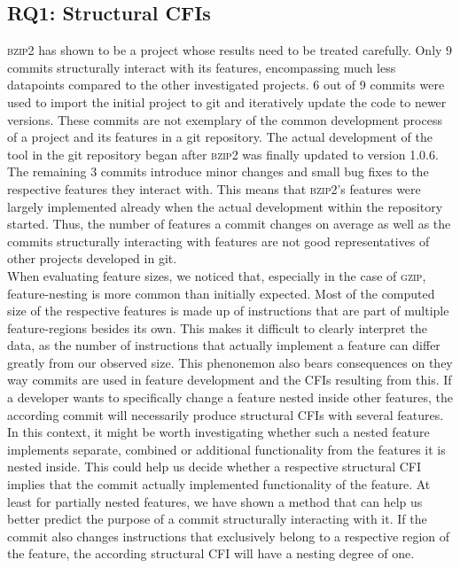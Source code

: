 \subsection*{\textbf{RQ1: Structural CFIs}}\label{sec:eval_struc_cfis}

\textsc{bzip2} has shown to be a project whose results need to be treated carefully.
Only 9 commits structurally interact with its features, encompassing much less datapoints compared to the other investigated projects.
6 out of 9 commits were used to import the initial project to git and iteratively update the code to newer versions.
These commits are not exemplary of the common development process of a project and its features in a git repository.
The actual development of the tool in the git repository began after \textsc{bzip2} was finally updated to version 1.0.6.
The remaining 3 commits introduce minor changes and small bug fixes to the respective features they interact with.
This means that \textsc{bzip2}'s features were largely implemented already when the actual development within the repository started.
Thus, the number of features a commit changes on average as well as the commits structurally interacting with features are not good representatives of other projects developed in git. \\
When evaluating feature sizes, we noticed that, especially in the case of \textsc{gzip}, feature-nesting is more common than initially expected.
Most of the computed size of the respective features is made up of instructions that are part of multiple feature-regions besides its own.
This makes it difficult to clearly interpret the data, as the number of instructions that actually implement a feature can differ greatly from our observed size.
This phenonemon also bears consequences on they way commits are used in feature development and the CFIs resulting from this.
If a developer wants to specifically change a feature nested inside other features, the according commit will necessarily produce structural CFIs with several features.
In this context, it might be worth investigating whether such a nested feature implements separate, combined or additional functionality from the features it is nested inside.
This could help us decide whether a respective structural CFI implies that the commit actually implemented functionality of the feature.
At least for partially nested features, we have shown a method that can help us better predict the purpose of a commit structurally interacting with it.
If the commit also changes instructions that exclusively belong to a respective region of the feature, the according structural CFI will have a nesting degree of one.
